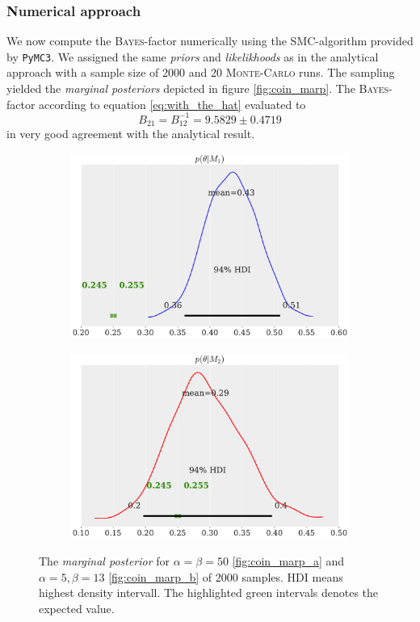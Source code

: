 \documentclass[%
 reprint,
 amsmath,amssymb,
 aps,
]{revtex4-1}
\begin{document}
\subsubsection{\textbf{Numerical approach}}
\noindent We now compute the \textsc{Bayes}-factor numerically using the SMC-algorithm provided by \texttt{PyMC3}. We assigned the same \emph{priors} and \emph{likelikhoods} as in the analytical approach with a sample size of 2000 and 20 \textsc{Monte-Carlo} runs. The sampling yielded the \emph{marginal posteriors} depicted in figure \eqref{fig:coin_marp}. 
The \textsc{Bayes}-factor according to equation \eqref{eq:with_the_hat} evaluated to
$$B_{21}=B_{12}^{-1}=9.5829\pm0.4719$$
in very good agreement with the analytical result.
\begin{figure}[htbp]
	\begin{subfigure}{\linewidth}
		\includegraphics[width=\linewidth]{coin_marp_m1.pdf}
		\subcaption{}\label{fig:coin_marp_a}
	\end{subfigure}
	\begin{subfigure}{\linewidth}
		\includegraphics[width=\linewidth]{coin_marp_m2.pdf}
		\subcaption{}\label{fig:coin_marp_b}
	\end{subfigure}
	\caption{The \emph{marginal posterior} for $\alpha=\beta=50$ \eqref{fig:coin_marp_a} and $\alpha=5, \beta=13$ \eqref{fig:coin_marp_b} of 2000 samples. HDI means highest density intervall. The highlighted green intervals denotes the expected value.}\label{fig:coin_marp}
\end{figure}
\end{document}
